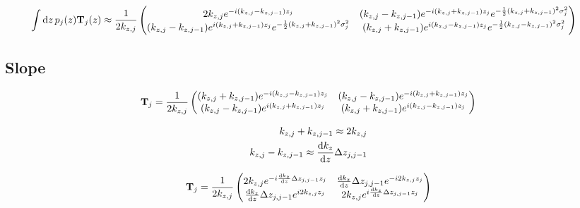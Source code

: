 \begin{align*}
	\int\dd{z}p_j\pqty{z} \vb{T}_j\pqty{z}                 & \approx \frac{1}{2k_{z,j}}\pmqty{
	2k_{z,j}e^{-i\pqty{k_{z,j} - k_{z,j-1}}z_j}            &
	\pqty{k_{z,j} - k_{z,j-1}}e^{-i\pqty{k_{z,j} + k_{z,j-1}}z_j}
	e^{-\frac{1}{2}\pqty{k_{z,j} + k_{z,j-1}}^2\sigma_j^2}                                     \\
	\pqty{k_{z,j} - k_{z,j-1}}e^{ i\pqty{k_{z,j} + k_{z,j-1}}z_j}
	e^{-\frac{1}{2}\pqty{k_{z,j} + k_{z,j-1}}^2\sigma_j^2} &
	\pqty{k_{z,j} + k_{z,j-1}}e^{ i\pqty{k_{z,j} - k_{z,j-1}}z_j}
	e^{-\frac{1}{2}\pqty{k_{z,j} - k_{z,j-1}}^2\sigma_j^2}
	}
\end{align*}

\subsection{Slope} %
\label{sub:slope}

\begin{align*}
	\vb{T}_j                                                      & = \frac{1}{2k_{z,j}}\pmqty{
	\pqty{k_{z,j} + k_{z,j-1}}e^{-i\pqty{k_{z,j} - k_{z,j-1}}z_j} &
	\pqty{k_{z,j} - k_{z,j-1}}e^{-i\pqty{k_{z,j} + k_{z,j-1}}z_j}                               \\
	\pqty{k_{z,j} - k_{z,j-1}}e^{ i\pqty{k_{z,j} + k_{z,j-1}}z_j} &
	\pqty{k_{z,j} + k_{z,j-1}}e^{ i\pqty{k_{z,j} - k_{z,j-1}}z_j}
	}                                                                                           \\
\end{align*}

\begin{align*}
	k_{z,j} + k_{z,j-1} \approx 2k_{z,j} \\
	k_{z,j} - k_{z,j-1} \approx \dv{k_{z}}{z} \Delta z_{j,j-1}
\end{align*}

\begin{align*}
	\vb{T}_j                                        & = \frac{1}{2k_{z,j}}\pmqty{
	2k_{z,j}e^{-i\dv{k_{z}}{z} \Delta z_{j,j-1}z_j} &
	\dv{k_{z}}{z} \Delta z_{j,j-1}e^{-i2k_{z,j}z_j}                               \\
	\dv{k_{z}}{z} \Delta z_{j,j-1}e^{ i2k_{z,j}z_j} &
	2k_{z,j}e^{ i\dv{k_{z}}{z} \Delta z_{j,j-1}z_j}
	}                                                                             \\
\end{align*}

